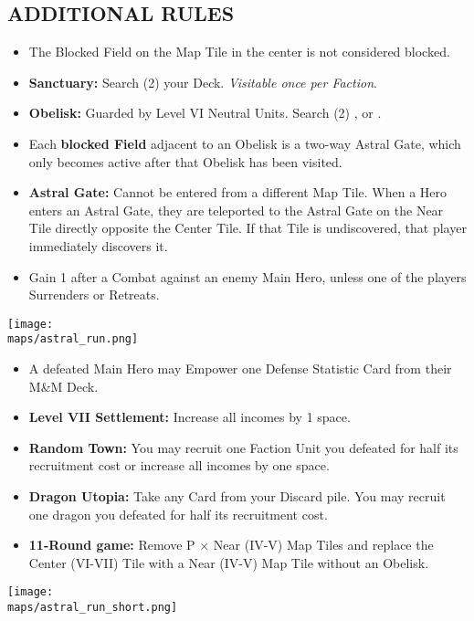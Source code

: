 \begin{multicols*}{2}
\subsection*{\MakeUppercase{Additional Rules}}
\begin{itemize}
  \item The Blocked Field on the Map Tile in the center is not considered blocked.
  \item \textbf{Sanctuary:} Search (2) your Deck. \textit{Visitable once per Faction}.
  \item \textbf{Obelisk:} Guarded by Level VI Neutral Units. Search (2) ,  or .
  \item Each \textbf{blocked Field} adjacent to an Obelisk is a two-way Astral Gate, which only becomes active after that Obelisk has been visited.
  \item \textbf{Astral Gate:} Cannot be entered from a different Map Tile. When a Hero enters an Astral Gate, they are teleported to the Astral Gate on the Near Tile directly opposite the Center Tile. If that Tile is undiscovered, that player immediately discovers it.
  \item Gain 1  after a Combat against an enemy Main Hero, unless one of the players Surrenders or Retreats.
\end{itemize}

\vspace*{\fill}
\begin{center}
  \texttt{[image: \\maps/astral\_run.png]}
\end{center}

\columnbreak

\begin{itemize}
  \item A defeated Main Hero may Empower one Defense Statistic Card from their M\&M Deck.
  \item \textbf{Level VII Settlement:} Increase all incomes by 1 space.
  \item \textbf{Random Town:} You may recruit one Faction Unit you defeated for half its recruitment cost or increase all incomes by one space.
  \item \textbf{Dragon Utopia:} Take any Card from your Discard pile. You may recruit one dragon you defeated for half its recruitment cost.
  \item \textbf{11-Round game:} Remove P × Near (IV-V) Map Tiles and replace the Center (VI-VII) Tile with a Near (IV-V) Map Tile without an Obelisk.
\end{itemize}

\begin{center}
  \hspace*{-2em}\texttt{[image: \\maps/astral\_run\_short.png]}
  \vspace*{-1em}
  \hspace*{2em}
\end{center}
\vspace*{\fill}

\end{multicols*}
